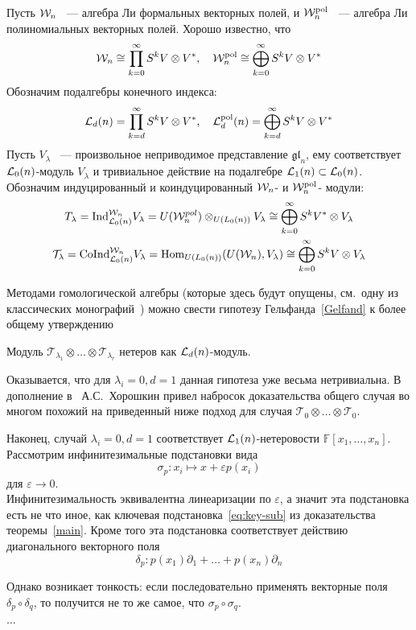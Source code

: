 Пусть $\mathcal{W}_n$ ~--- алгебра Ли формальных векторных полей, и $\mathcal{W}^{\mathrm{pol}}_n$ ~--- алгебра Ли полиномиальных векторных полей.
Хорошо известно, что
\[
    \mathcal{W}_n \cong \prod\limits_{k=0}^{\infty} S^k V\otimes V^*, \quad \mathcal{W}^{\mathrm{pol}}_n \cong \bigoplus\limits_{k=0}^{\infty} S^k V\otimes V^*
\]
Обозначим подалгебры конечного индекса:
\[
    \mathcal{L}_d(n) = \prod\limits_{k=d}^{\infty} S^k V\otimes V^*, \quad \mathcal{L}^{\mathrm{pol}}_d(n) = \bigoplus\limits_{k=d}^{\infty} S^k V\otimes V^*
\]
Пусть $V_{\lambda}$ ~--- произвольное неприводимое представление $\mathfrak{gl}_n$, ему соответствует $\mathcal{L}_0(n)$-модуль $V_{\lambda}$ и тривиальное действие на подалгебре $\mathcal{L}_1(n)\subset\mathcal{L}_0(n)$.
Обозначим индуцированный и коиндуцированный $\mathcal{W}_n$- и $\mathcal{W}^{\mathrm{pol}}_n$- модули:
\begin{gather*}
    T_{\lambda} = \mathrm{Ind}^{\mathcal{W}_n}_{\mathcal{L}_0(n)} V_{\lambda} = U(\mathcal{W}_n^{pol}) \otimes_{U(L_0(n))} V_{\lambda} \cong \bigoplus_{k=0}^{\infty} S^k V^*\otimes V_{\lambda} \\
    \mathcal{T}_{\lambda} = \mathrm{CoInd}^{\mathcal{W}_n}_{\mathcal{L}_0(n)} V_{\lambda} = \operatorname{Hom}_{U(L_0(n))}(U(\mathcal{W}_n), V_{\lambda}) \cong \bigoplus_{k=0}^{\infty} S^k V\otimes V_{\lambda}
\end{gather*}

Методами гомологической алгебры (которые здесь будут опущены, см.\ одну из классических монографий~\cite{Fuks}) можно свести гипотезу Гельфанда~\ref{Gelfand} к более общему утверждению

\vskip 0.1in\noindent
\begin{conjecture}
    Модуль $\mathcal{T}_{\lambda_1}\otimes\ldots\otimes\mathcal{T}_{\lambda_r}$ нетеров как $\mathcal{L}_d(n)$-модуль.
\end{conjecture}
\vskip 0.1in\noindent
\vskip 1.5in
Оказывается, что для $\lambda_i=0, d=1$ данная гипотеза уже весьма нетривиальна.
В дополнение в~\cite{Feigin-Kanel-Khoroshkin} А.С.\ Хорошкин привел набросок доказательства общего случая во многом похожий на приведенный ниже подход для случая $\mathcal{T}_{0}\otimes\ldots\otimes\mathcal{T}_{0}$.

Наконец, случай $\lambda_i=0, d=1$ соответствует $\mathcal{L}_1(n)$-нетеровости $\mathbb{F}[x_1, \ldots, x_n]$.
Рассмотрим инфинитезимальные подстановки вида
\[
    \sigma_p: x_i \mapsto x + \varepsilon p(x_i)
\]
для $\varepsilon\to 0$.\\
Инфинитезимальность эквивалентна линеаризации по $\varepsilon$, а значит эта подстановка есть не что иное, как ключевая подстановка~\ref{eq:key-sub} из доказательства теоремы~\ref{main}.
Кроме того эта подстановка соответствует действию диагонального векторного поля
\[
    \delta_p: p(x_1)\partial_1 + \ldots + p(x_n)\partial_n
\]

Однако возникает тонкость: если последовательно применять векторные поля $\delta_p \circ \delta_q$,
то получится не то же самое, что $\sigma_p \circ \sigma_q$.

$\ldots$